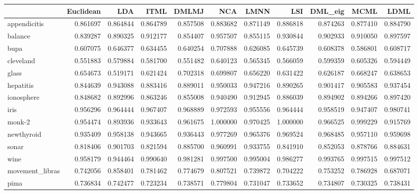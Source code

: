 \begin{tabular}{lrrrrrrrrrr}
\toprule
{} &  Euclidean &       LDA &      ITML &     DMLMJ &       NCA &      LMNN &       LSI &   DML\_eig &      MCML &      LDML \\
\midrule
appendicitis    &   0.861697 &  0.864844 &  0.864789 &  0.857508 &  0.883682 &  0.871149 &  0.886818 &  0.874263 &  0.877410 &  0.884790 \\
balance         &   0.839287 &  0.890325 &  0.912177 &  0.854407 &  0.957507 &  0.855115 &  0.930844 &  0.902933 &  0.910050 &  0.897597 \\
bupa            &   0.607075 &  0.646377 &  0.634455 &  0.640254 &  0.707888 &  0.626085 &  0.645739 &  0.608378 &  0.586801 &  0.608717 \\
cleveland       &   0.551883 &  0.579884 &  0.581700 &  0.551482 &  0.640123 &  0.565345 &  0.566059 &  0.599359 &  0.605326 &  0.594449 \\
glass           &   0.654673 &  0.519171 &  0.621424 &  0.702318 &  0.699807 &  0.656220 &  0.631422 &  0.626187 &  0.668247 &  0.638653 \\
hepatitis       &   0.844639 &  0.943088 &  0.883416 &  0.889011 &  0.950033 &  0.947216 &  0.890265 &  0.901417 &  0.905583 &  0.937454 \\
ionosphere      &   0.848682 &  0.892996 &  0.863246 &  0.855008 &  0.940490 &  0.912945 &  0.886039 &  0.894902 &  0.894266 &  0.897420 \\
iris            &   0.956296 &  0.964444 &  0.967407 &  0.968889 &  0.972593 &  0.955556 &  0.964444 &  0.958519 &  0.947407 &  0.980741 \\
monk-2          &   0.954474 &  0.893936 &  0.933643 &  0.961675 &  1.000000 &  0.970425 &  1.000000 &  0.966525 &  0.999229 &  0.915769 \\
newthyroid      &   0.935409 &  0.958138 &  0.943665 &  0.936443 &  0.977269 &  0.965376 &  0.969524 &  0.968485 &  0.957110 &  0.959698 \\
sonar           &   0.818406 &  0.901703 &  0.821594 &  0.885700 &  0.960991 &  0.933755 &  0.841910 &  0.852053 &  0.878766 &  0.884631 \\
wine            &   0.958179 &  0.944464 &  0.990640 &  0.981281 &  0.997500 &  0.995004 &  0.986277 &  0.993765 &  0.997515 &  0.997512 \\
movement\_libras &   0.742056 &  0.858401 &  0.781462 &  0.774679 &  0.807521 &  0.739872 &  0.704222 &  0.753252 &  0.786928 &  0.687071 \\
pima            &   0.736834 &  0.742477 &  0.723234 &  0.738571 &  0.779804 &  0.731047 &  0.733652 &  0.734807 &  0.730325 &  0.738431 \\

\end{tabular}
